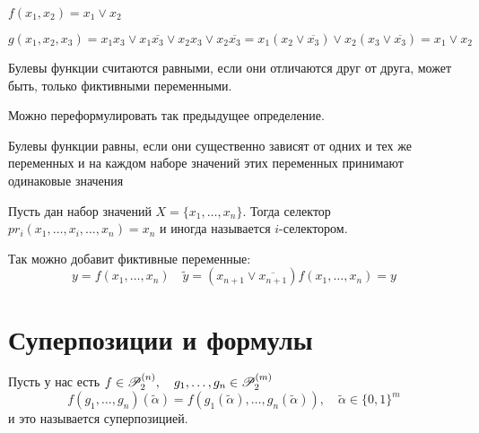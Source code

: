 $f(x_1,x_2) = x_1 \lor x_2$

$g(x_1,x_2,x_3) = x_1x_3 \lor x_1\overline{x_3} \lor x_2x_3 \lor x_2\overline{x_3} = 
x_1(x_2 \lor \overline{x_3}) \lor x_2(x_3 \lor \overline{x_3}) = x_1 \lor x_2$

\begin{definition}
Булевы функции считаются равными, если они отличаются друг от друга, может быть, только
фиктивными переменными.
\end{definition}


Можно переформулировать так предыдущее определение.

\begin{definition}
Булевы функции равны, если они существенно зависят от одних и тех же переменных
и на каждом наборе значений этих переменных принимают одинаковые значения
\end{definition}

\medskip

Пусть дан набор значений $X = \{x_1,\ldots,x_{n}\} $.
Тогда селектор $pr_i(x_1,\ldots,x_{i},\ldots,x_{n}) = x_{n}$ и иногда называется
$i$-селектором.

\medskip

Так можно добавит фиктивные переменные:
\[
    y = f(x_1,\ldots,x_{n}) \quad \widetilde{y} = (x_{n+1} \lor \overline{x_{n+1}})
    f(x_1,\ldots,x_{n}) = y
\] 

\section{Суперпозиции и формулы}

\begin{definition}
Пусть у нас есть $f \in \mathscr{P}_2^{(n)}, \quad g_1,\ldots,g_n \in \mathscr{P}_2^{(m)}$
\[
    f(g_1,\ldots,g_n)(\widetilde{\alpha}) = f(g_1(\widetilde{\alpha}), \ldots,
    g_n(\widetilde{\alpha})), \quad \widetilde{\alpha} \in  \{0,1\}^{m} 
\]
и это называется суперпозицией.
\end{definition}



